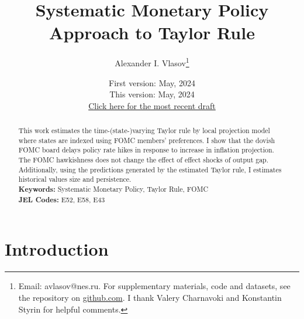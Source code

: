 \documentclass[11pt]{article}
\title{Systematic Monetary Policy Approach to Taylor Rule}
\author{Alexander I. Vlasov\thanks{Email: avlasov@nes.ru. For supplementary materials, code and datasets, see the repository on \href{https://github.com/alvlsv/CheckingHank}{github.com}. I thank Valery Charnavoki and Konstantin Styrin for helpful comments.}}
\date{\normalsize First version: May, 2024\\\vspace{1ex} This version: May, 2024\\ \vspace{1ex}
\href{https://github.com/alvlsv/CheckingHank/blob/main/Checking_HANK/Paper/CheckingHANK.pdf}{Click here for the most recent draft}}
\begin{document}
\maketitle



\begin{abstract}
    \noindent This work estimates the time-(state-)varying Taylor rule by local projection model where states are indexed using FOMC members' preferences. 
    I show that the dovish FOMC board delays policy rate hikes in response to increase in inflation projection. The FOMC hawkishness does not change the effect of effect shocks of output gap. 
    Additionally, using the predictions generated by the estimated Taylor rule, I estimates historical values size and persistence. 
    \\
    \noindent\textbf{Keywords:} Systematic Monetary Policy, Taylor Rule, FOMC
    \\
    \noindent\textbf{JEL Codes:} E52, E58, E43\\
    \bigskip
\end{abstract}

\section{Introduction}


\end{document}

